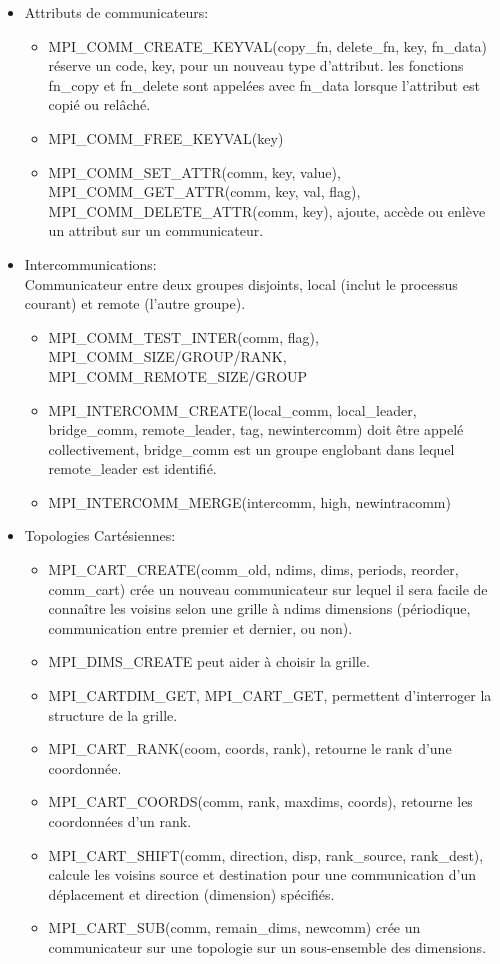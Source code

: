 \documentclass[oneside]{book}
\begin{document}
\begin{itemize}
\item Attributs de communicateurs:\\
\begin{itemize}
\item MPI\_COMM\_CREATE\_KEYVAL(copy\_fn, delete\_fn, key,
fn\_data) réserve un code, key, pour un nouveau type
d'attribut. les fonctions fn\_copy et fn\_delete sont appelées
avec fn\_data lorsque l'attribut est copié ou relâché.

\item MPI\_COMM\_FREE\_KEYVAL(key)
\item MPI\_COMM\_SET\_ATTR(comm, key, value),
MPI\_COMM\_GET\_ATTR(comm, key, val, flag),
MPI\_COMM\_DELETE\_ATTR(comm, key), ajoute, accède
ou enlève un attribut sur un communicateur.
\end{itemize}
\item Intercommunications:\\
Communicateur entre deux groupes disjoints, local (inclut le
processus courant) et remote (l'autre groupe).
\begin{itemize}
\item MPI\_COMM\_TEST\_INTER(comm, flag),
MPI\_COMM\_SIZE/GROUP/RANK,
MPI\_COMM\_REMOTE\_SIZE/GROUP

\item MPI\_INTERCOMM\_CREATE(local\_comm, local\_leader,
bridge\_comm, remote\_leader, tag, newintercomm) doit être
appelé collectivement, bridge\_comm est un groupe englobant
dans lequel remote\_leader est identifié.
\item MPI\_INTERCOMM\_MERGE(intercomm, high, newintracomm)
\end{itemize}

\item Topologies Cartésiennes:\\
\begin{itemize}
\item MPI\_CART\_CREATE(comm\_old, ndims, dims, periods,
reorder, comm\_cart) crée un nouveau communicateur sur
lequel il sera facile de connaître les voisins selon une grille
à ndims dimensions (périodique, communication entre
premier et dernier, ou non).

\item MPI\_DIMS\_CREATE peut aider à choisir la grille.
\item MPI\_CARTDIM\_GET, MPI\_CART\_GET, permettent
d'interroger la structure de la grille.
\item MPI\_CART\_RANK(coom, coords, rank), retourne le rank d'une
coordonnée.
\item MPI\_CART\_COORDS(comm, rank, maxdims, coords), retourne les
coordonnées d'un rank.
\item MPI\_CART\_SHIFT(comm, direction, disp, rank\_source, rank\_dest),
calcule les voisins source et destination pour une communication
d'un déplacement et direction (dimension) spécifiés.
\item MPI\_CART\_SUB(comm, remain\_dims, newcomm) crée un
communicateur sur une topologie sur un sous-ensemble des
dimensions.
\end{itemize}


\end{itemize}
\end{document}
